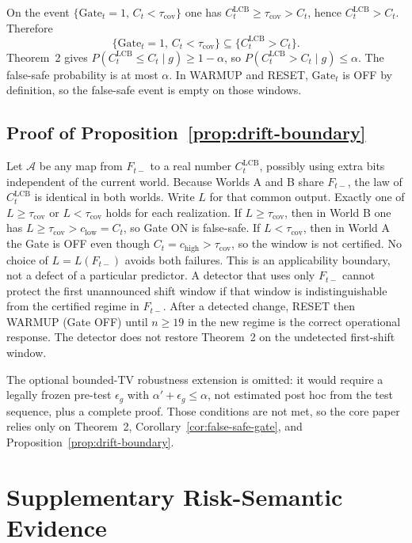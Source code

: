 On the event $\{\mathrm{Gate}_t=1,\,C_t<\tau_{\mathrm{cov}}\}$ one has
$C^{\mathrm{LCB}}_t\ge\tau_{\mathrm{cov}}>C_t$, hence
$C^{\mathrm{LCB}}_t>C_t$.  Therefore
\[
 \{\mathrm{Gate}_t=1,\,C_t<\tau_{\mathrm{cov}}\}
 \subseteq
 \{C^{\mathrm{LCB}}_t>C_t\}.
\]
Theorem~2 gives $P(C^{\mathrm{LCB}}_t\le C_t\mid g)\ge 1-\alpha$,
so $P(C^{\mathrm{LCB}}_t>C_t\mid g)\le\alpha$.  The false-safe probability is
at most $\alpha$.  In WARMUP and RESET, $\mathrm{Gate}_t$ is OFF by definition,
so the false-safe event is empty on those windows.

\subsection{Proof of Proposition~\ref{prop:drift-boundary}}
\label{app:proof_drift_boundary}

Let $\mathcal{A}$ be any map from $F_{t-}$ to a real number
$C^{\mathrm{LCB}}_t$, possibly using extra bits independent of the current
world.  Because Worlds A and B share $F_{t-}$, the law of
$C^{\mathrm{LCB}}_t$ is identical in both worlds.  Write $L$ for that common
output.  Exactly one of $L\ge\tau_{\mathrm{cov}}$ or $L<\tau_{\mathrm{cov}}$
holds for each realization.  If $L\ge\tau_{\mathrm{cov}}$, then in World B one
has $L\ge\tau_{\mathrm{cov}}>c_{\mathrm{low}}=C_t$, so Gate ON is false-safe.
If $L<\tau_{\mathrm{cov}}$, then in World A the Gate is OFF even though
$C_t=c_{\mathrm{high}}>\tau_{\mathrm{cov}}$, so the window is not certified.
No choice of $L=L(F_{t-})$ avoids both failures.  This is an applicability
boundary, not a defect of a particular predictor.  A detector that uses only
$F_{t-}$ cannot protect the first unannounced shift window if that window is
indistinguishable from the certified regime in $F_{t-}$.  After a detected
change, RESET then WARMUP (Gate OFF) until $n\ge 19$ in the new regime is the
correct operational response.  The detector does not restore
Theorem~2 on the undetected first-shift window.

The optional bounded-TV robustness extension is omitted: it would require a
legally frozen pre-test $\epsilon_g$ with $\alpha'+\epsilon_g\le\alpha$, not
estimated post hoc from the test sequence, plus a complete proof.  Those
conditions are not met, so the core paper relies only on
Theorem~2, Corollary~\ref{cor:false-safe-gate}, and
Proposition~\ref{prop:drift-boundary}.


\section{Supplementary Risk-Semantic Evidence}
\label{app:risk_semantic_evidence}

